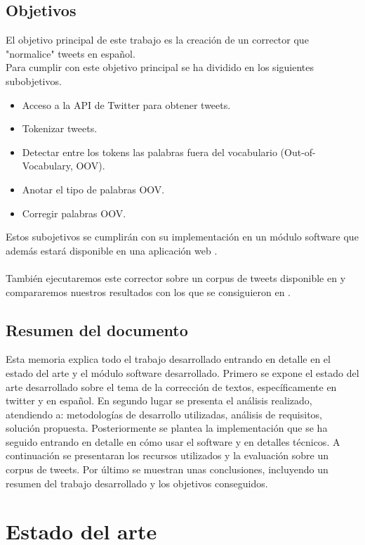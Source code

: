 \documentclass[spanish,12pt, a4paper,twoside]{paper}
\let\oldsection\section
\def\section{\cleardoublepage\oldsection}
\begin{document}
\subsection{Objetivos}\label{sec:objetivos}
El objetivo principal de este trabajo es la creación de un corrector que "normalice" tweets en español.\\Para cumplir con este objetivo principal se ha dividido en los siguientes subobjetivos.
\begin{itemize}
\item Acceso a la API de Twitter para obtener tweets.
\item Tokenizar tweets.
\item Detectar entre los tokens las palabras fuera del vocabulario (Out-of-Vocabulary, OOV).
\item Anotar el tipo de palabras OOV.
\item Corregir palabras OOV. 
\end{itemize}
Estos subojetivos se cumplirán con su implementación en un módulo software que además estará disponible en una aplicación web \cite{tweetscweb}.\\\\
También ejecutaremos este corrector sobre un corpus de tweets disponible en \cite{tweetnorm} y compararemos nuestros resultados con los que se consiguieron en \cite{alegria:2013}.

\subsection{Resumen del documento}\label{sec:resumen}
Esta memoria explica todo el trabajo desarrollado entrando en detalle en el estado del arte y el  módulo software desarrollado. Primero se expone el estado del arte desarrollado sobre el tema de la corrección de textos, específicamente en twitter y en español. En segundo lugar se presenta el análisis realizado, atendiendo a: metodologías de desarrollo utilizadas, análisis de requisitos, solución propuesta. Posteriormente se plantea la implementación que se ha seguido entrando en detalle en cómo usar el software y en detalles técnicos. A continuación se presentaran los recursos utilizados y la evaluación sobre un corpus de tweets. Por último se muestran unas conclusiones, incluyendo un resumen del trabajo desarrollado y los objetivos conseguidos.
\section{Estado del arte}\label{sec:estadodelarte}
\end{document}
